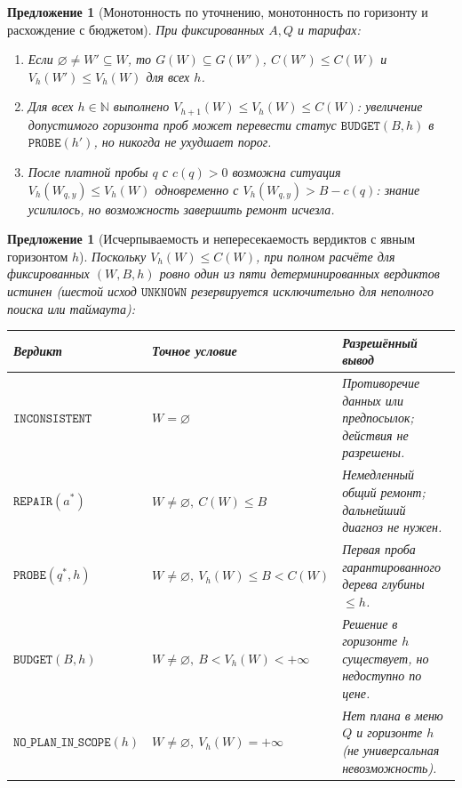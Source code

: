 \documentclass[11pt,a4paper]{article}
\theoremstyle{preprintthm}
\newtheorem{proposition}[theorem]{Предложение}
\theoremstyle{preprintdef}
\begin{document}
\begin{proposition}[Монотонность по уточнению, монотонность по горизонту и расхождение с бюджетом]
\label{prop:monotonicity}
При фиксированных $A,Q$ и тарифах:
\begin{enumerate}
  \item Если $\varnothing\ne W'\subseteq W$, то $G(W)\subseteq G(W')$, $C(W')\le C(W)$ и $V_h(W')\le V_h(W)$ для всех $h$.
  \item Для всех $h\in\mathbb{N}$ выполнено $V_{h+1}(W)\le V_h(W)\le C(W)$: увеличение допустимого горизонта проб может перевести статус $\texttt{BUDGET}(B,h)$ в $\texttt{PROBE}(h')$, но никогда не ухудшает порог.
  \item После платной пробы $q$ с $c(q)>0$ возможна ситуация $V_h(W_{q,y})\le V_h(W)$ одновременно с $V_h(W_{q,y})>B-c(q)$: знание усилилось, но возможность завершить ремонт исчезла.
\end{enumerate}
\end{proposition}

\begin{proposition}[Исчерпываемость и непересекаемость вердиктов с явным горизонтом $h$]
\label{prop:verdicts}
Поскольку $V_h(W)\le C(W)$, при полном расчёте для фиксированных $(W,B,h)$ ровно один из пяти детерминированных вердиктов истинен (шестой исход $\texttt{UNKNOWN}$ резервируется исключительно для неполного поиска или таймаута):
\begin{center}
\normalfont\footnotesize
\begin{tabularx}{\linewidth}{@{}l l >{\raggedright\arraybackslash}X@{}}
\toprule
\textbf{Вердикт} & \textbf{Точное условие} & \textbf{Разрешённый вывод} \\
\midrule
$\texttt{INCONSISTENT}$ & $W=\varnothing$ & Противоречие данных или предпосылок; действия не разрешены. \\
$\texttt{REPAIR}(a^*)$ & $W\ne\varnothing,\ C(W)\le B$ & Немедленный общий ремонт; дальнейший диагноз не нужен. \\
$\texttt{PROBE}(q^*,h)$ & $W\ne\varnothing,\ V_h(W)\le B < C(W)$ & Первая проба гарантированного дерева глубины $\le h$. \\
$\texttt{BUDGET}(B,h)$ & $W\ne\varnothing,\ B < V_h(W) < +\infty$ & Решение в горизонте $h$ существует, но недоступно по цене. \\
$\texttt{NO\_PLAN\_IN\_SCOPE}(h)$ & $W\ne\varnothing,\ V_h(W)=+\infty$ & Нет плана в меню $Q$ и горизонте $h$ (не универсальная невозможность). \\
\bottomrule
\end{tabularx}
\end{center}
\end{proposition}
\end{document}
